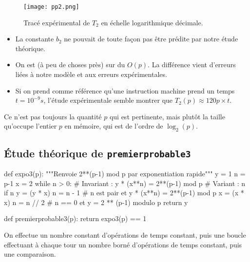 \begin{figure}[!h]
  \begin{center}
    \texttt{[image: pp2.png]}
    \caption{Tracé expérimental de $T_2$ en échelle logarithmique décimale.}
    \label{fig.pp2}
  \end{center}
\end{figure}


\begin{itemize}
\item[\textbullet] La constante $b_{2}$ ne pouvait de toute façon pas être prédite
  par notre étude théorique.
\item[\textbullet] On est (à peu de choses près) sur du $O(p)$. La différence vient
  d'erreurs liées à notre modèle et aux erreurs expérimentales.
\item[\textbullet] Si on prend comme référence qu'une instruction machine prend
  un temps $t = 10^{-9}s$, l'étude expérimentale semble montrer que
  $T_{2}(p)\approx 120 p \times t$.
\end{itemize}

\begin{rem}
  Ce n'est pas toujours la quantité $p$ qui est pertinente, mais plutôt la taille qu'occupe l'entier $p$ en mémoire, qui est de l'ordre de $\log_2(p)$.
\end{rem}

\newpage

\subsection{Étude théorique de \texttt{premierprobable3}}

\begin{pyverbatim}
def expo3(p):
    """Renvoie 2**(p-1) mod p par exponentiation rapide"""
    y = 1
    n = p-1
    x = 2
    while n > 0:
        # Invariant : y * (x**n) = 2**(p-1) mod p
        # Variant : n
        if n %
            y = (y * x) %
            n = n - 1
        # n est pair et y * (x**n) = 2**(p-1) mod p
        x = (x * x) %
        n = n // 2
    # n == 0 et y = 2 ** (p-1) modulo p
    return y

def premierprobable3(p):
    return expo3(p) == 1
\end{pyverbatim}


On effectue un nombre constant d'opérations de temps constant, puis
une boucle  effectuant à chaque tour un nombre borné
d'opérations de temps constant, puis une comparaison.

